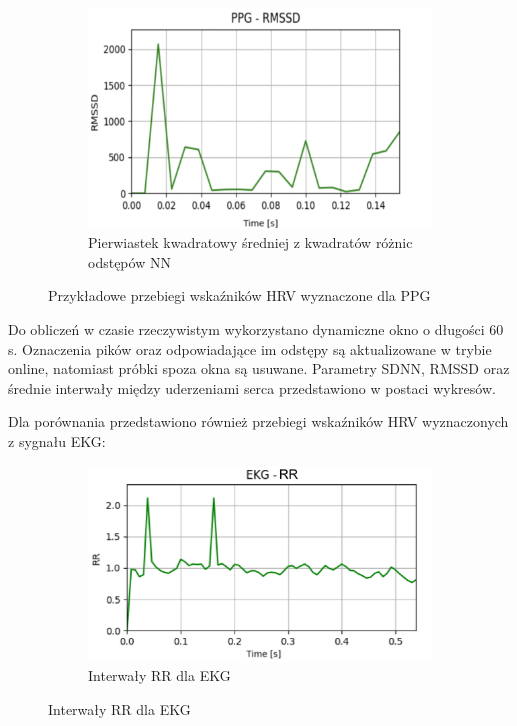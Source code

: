\documentclass[journal]{IEEEtran}
\begin{document}
{\begin{figure}[h]
    \vspace{0.2cm}  
    \begin{subfigure}{0.47\textwidth}
        \centering
        \includegraphics[width=\linewidth]{RMSSD.png}
        \caption{Pierwiastek kwadratowy średniej z kwadratów różnic  odstępów NN}
    \end{subfigure}  
    \caption{Przykładowe przebiegi wskaźników HRV wyznaczone dla PPG}
\end{figure}

\newpage
Do obliczeń w czasie rzeczywistym wykorzystano dynamiczne okno o długości 60 s. Oznaczenia pików oraz odpowiadające im odstępy są aktualizowane w trybie online, natomiast próbki spoza okna są usuwane. Parametry SDNN, RMSSD oraz średnie interwały między uderzeniami serca przedstawiono w postaci wykresów.

Dla porównania przedstawiono również przebiegi wskaźników HRV wyznaczonych z sygnału EKG:

\begin{figure}[h]
    \centering
    \begin{subfigure}{0.47\textwidth}
        \centering
        \includegraphics[width=\linewidth]{MEAN_EKG.png}
        \caption{Interwały RR dla EKG}
    \end{subfigure}
    

\end{figure}}
\end{document}

